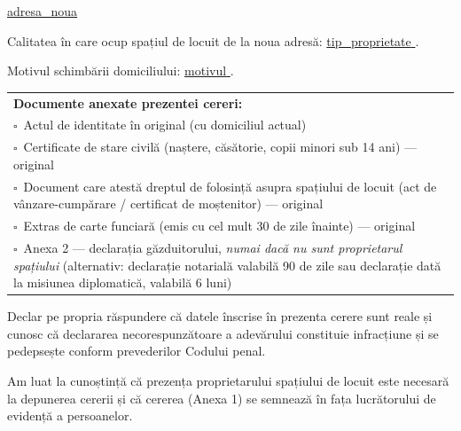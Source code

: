 \documentclass[11pt,a4paper]{article}
\newcommand{\checkboxempty}{$\square$}
\begin{document}
\vspace{0.2cm}

\underline{ {{adresa_noua}} }

\vspace{0.3cm}

\hspace{1cm}Calitatea în care ocup spațiul de locuit de la noua adresă:
\underline{ {{tip_proprietate}} }.

\vspace{0.3cm}

\hspace{1cm}Motivul schimbării domiciliului: \underline{ {{motivul}} }.

\vspace{0.4cm}

\begin{tabularx}{\textwidth}{|X|}
\hline
\textbf{Documente anexate prezentei cereri:}\\
\checkboxempty\ Actul de identitate în original (cu domiciliul actual)\\
\checkboxempty\ Certificate de stare civilă (naștere, căsătorie, copii minori sub 14 ani) --- original\\
\checkboxempty\ Document care atestă dreptul de folosință asupra spațiului de locuit
(act de vânzare-cumpărare / certificat de moștenitor) --- original\\
\checkboxempty\ Extras de carte funciară (emis cu cel mult 30 de zile înainte) --- original\\
\checkboxempty\ Anexa 2 --- declarația găzduitorului, \emph{numai dacă nu sunt proprietarul spațiului}
(alternativ: declarație notarială valabilă 90 de zile sau declarație dată la misiunea diplomatică, valabilă 6 luni)\\
\hline
\end{tabularx}

\vspace{0.4cm}

\hspace{1cm}Declar pe propria răspundere că datele înscrise în prezenta cerere sunt reale și
cunosc că declararea necorespunzătoare a adevărului constituie infracțiune și se pedepsește
conform prevederilor Codului penal.

\vspace{0.3cm}

\hspace{1cm}Am luat la cunoștință că prezența proprietarului spațiului de locuit este
necesară la depunerea cererii și că cererea (Anexa 1) se semnează în fața lucrătorului
de evidență a persoanelor.
\end{document}
